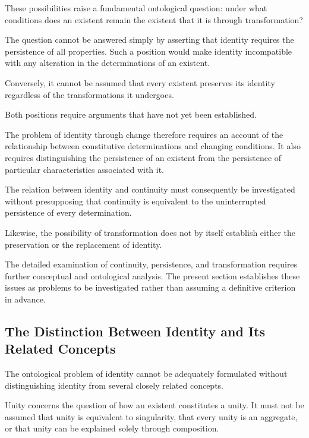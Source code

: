 These possibilities raise a fundamental
ontological question: under what conditions
does an existent remain the existent that
it is through transformation?

The question cannot be answered simply by
asserting that identity requires the persistence
of all properties. Such a position would make
identity incompatible with any alteration
in the determinations of an existent.

Conversely, it cannot be assumed that every
existent preserves its identity regardless
of the transformations it undergoes.

Both positions require arguments that have
not yet been established.

The problem of identity through change therefore
requires an account of the relationship between
constitutive determinations and changing
conditions. It also requires distinguishing
the persistence of an existent from the
persistence of particular characteristics
associated with it.

The relation between identity and continuity
must consequently be investigated without
presupposing that continuity is equivalent
to the uninterrupted persistence of every
determination.

Likewise, the possibility of transformation
does not by itself establish either the
preservation or the replacement of identity.

The detailed examination of continuity,
persistence, and transformation requires
further conceptual and ontological analysis.
The present section establishes these issues
as problems to be investigated rather than
assuming a definitive criterion in advance.



\subsection{The Distinction Between Identity and Its Related Concepts}

The ontological problem of identity cannot
be adequately formulated without distinguishing
identity from several closely related concepts.

Unity concerns the question of how an existent
constitutes a unity. It must not be assumed
that unity is equivalent to singularity,
that every unity is an aggregate, or that
unity can be explained solely through composition.


